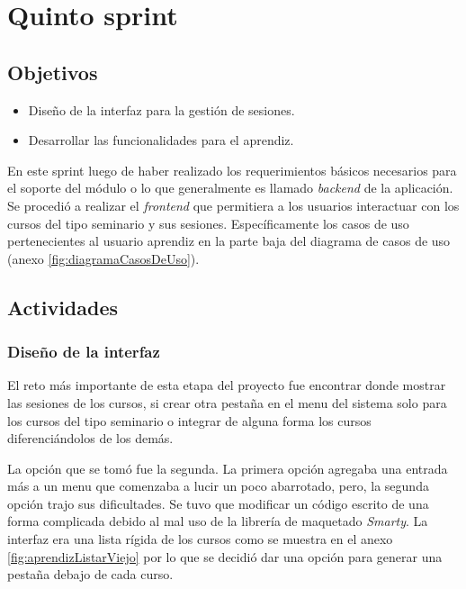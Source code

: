 ﻿\section{Quinto sprint} %
\label{sec:quinto_sprint}

\subsection{Objetivos}

\begin{itemize}
	\item Diseño de la interfaz para la gestión de sesiones.
	\item Desarrollar las funcionalidades para el aprendiz.
\end{itemize}

En este sprint luego de haber realizado los requerimientos básicos necesarios para el soporte del módulo o lo que generalmente es llamado \emph{backend} de la aplicación. Se procedió a realizar el \emph{frontend} que permitiera a los usuarios interactuar con los cursos del tipo seminario y sus sesiones. Específicamente los casos de uso pertenecientes al usuario aprendiz en la parte baja del diagrama de casos de uso (anexo \ref{fig:diagramaCasosDeUso}).

\subsection{Actividades} %
\label{sub:actividades5}

\subsubsection{Diseño de la interfaz}
El reto más importante de esta etapa del proyecto fue encontrar donde mostrar las sesiones de los cursos, si crear otra pestaña en el menu del sistema solo para los cursos del tipo seminario o integrar de alguna forma los cursos diferenciándolos de los demás.

La opción que se tomó fue la segunda. La primera opción agregaba una entrada más a un menu que comenzaba a lucir un poco abarrotado, pero, la segunda opción trajo sus dificultades. Se tuvo que modificar un código escrito de una forma complicada debido al mal uso de la librería de maquetado \emph{Smarty}. La interfaz era una lista rígida de los cursos como se muestra en el anexo \ref{fig:aprendizListarViejo} por lo que se decidió dar una opción para generar una pestaña debajo de cada curso.


